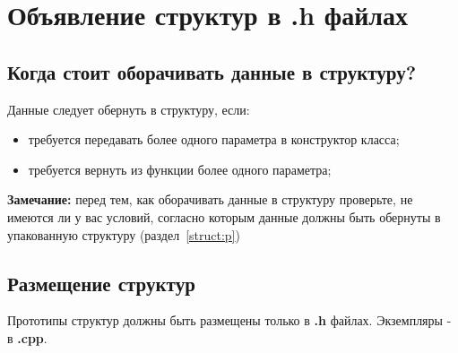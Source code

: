 \chapter{Объявление структур в .h файлах}\label{struct}
\section{Когда стоит оборачивать данные в структуру?}
Данные следует обернуть в структуру, если:
\begin{itemize}
	\item требуется передавать более одного параметра в конструктор класса;
	\item требуется вернуть из функции более одного параметра;
\end{itemize}
\textbf{Замечание: }перед тем, как оборачивать данные в структуру проверьте, не имеются ли у вас условий, согласно которым данные должны быть обернуты в упакованную структуру (раздел~\ref{struct:p})
\section{Размещение структур}
Прототипы структур должны быть размещены только в \textbf{.h} файлах. Экземпляры - в \textbf{.cpp}.

